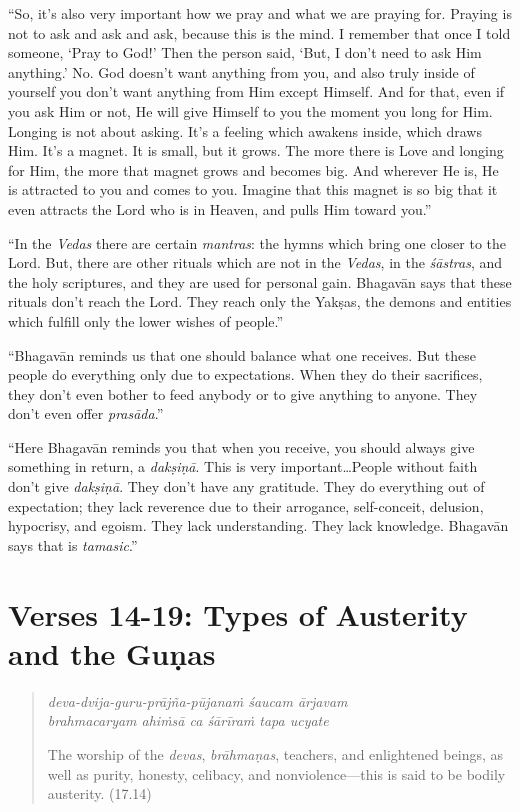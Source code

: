 \documentclass[12pt, twoside, openright]{memoir}
\begin{document}
\enquote{So, it’s also very important how we pray and what we are praying for. Praying is not to ask and ask and ask, because this is the mind. I remember that once I told someone, \enquote{Pray to God!} Then the person said, \enquote{But, I don’t need to ask Him anything.} No. God doesn’t want anything from you, and also truly inside of yourself you don’t want anything from Him except Himself. And for that, even if you ask Him or not, He will give Himself to you the moment you long for Him. Longing is not about asking. It’s a feeling which awakens inside, which draws Him. It’s a magnet. It is small, but it grows. The more there is Love and longing for Him, the more that magnet grows and becomes big. And wherever He is, He is attracted to you and comes to you. Imagine that this magnet is so big that it even attracts the Lord who is in Heaven, and pulls Him toward you.}

\enquote{In the \textit{Vedas} there are certain \textit{mantras}: the hymns which bring one closer to the Lord. But, there are other rituals which are not in the \textit{Vedas}, in the \textit{śāstras}, and the holy scriptures, and they are used for personal gain. Bhagavān says that these rituals don’t reach the Lord. They reach only the Yakṣas, the demons and entities which fulfill only the lower wishes of people.}

\enquote{Bhagavān reminds us that one should balance what one receives. But these people do everything only due to expectations. When they do their sacrifices, they don’t even bother to feed anybody or to give anything to anyone. They don’t even offer \textit{prasāda}.}

\enquote{Here Bhagavān reminds you that when you receive, you should always give something in return, a \textit{dakṣiṇā}. This is very important\ldots People without faith don’t give \textit{dakṣiṇā}. They don’t have any gratitude. They do everything out of expectation; they lack reverence due to their arrogance, self-conceit, delusion, hypocrisy, and egoism. They lack understanding. They lack knowledge. Bhagavān says that is \textit{tamasic}.}

\section{Verses 14-19: Types of Austerity and the Guṇas}\label{sec-verses-14-19-types-of-austerity-and-the-gunas}


\par
\begin{verse}
\textit{deva-dvija-guru-prājña-pūjanaṁ śaucam ārjavam} \\
\textit{brahmacaryam ahiṁsā ca śārīraṁ tapa ucyate}

\noindent The worship of the \textit{devas}, \textit{brāhmaṇas}, teachers, and enlightened beings, as well as purity, honesty, celibacy, and nonviolence---this is said to be bodily austerity. (17.14)
\end{verse}
\par
\end{document}
